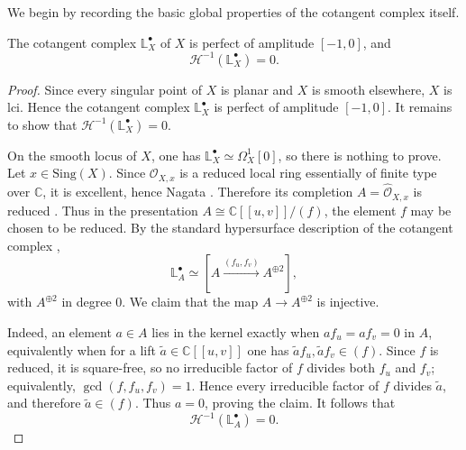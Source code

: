 \documentclass[12pt,reqno]{amsart}
\begin{document}
We begin by recording the basic global properties of the cotangent complex itself.

\begin{lemma}\label{lem:plane-cotangent}
The cotangent complex \(\mathbb{L}^{\bullet}_X\) of \(X\) is perfect of amplitude \([-1,0]\), and
\[
\mathcal H^{-1}(\mathbb{L}^{\bullet}_X)=0.
\]
\end{lemma}

\begin{proof}
Since every singular point of \(X\) is planar and \(X\) is smooth elsewhere, \(X\) is lci. Hence the cotangent complex \(\mathbb{L}^{\bullet}_X\) is perfect of amplitude \([-1,0]\). It remains to show that \(\mathcal H^{-1}(\mathbb{L}^{\bullet}_X)=0\).

On the smooth locus of \(X\), one has \(\mathbb{L}^{\bullet}_X\simeq \Omega_X^1[0]\), so there is nothing to prove. Let \(x\in \mathrm{Sing}(X)\). Since \(\mathcal O_{X,x}\) is a reduced local ring essentially of finite type over \(\mathbb C\), it is excellent, hence Nagata \cite[\href{https://stacks.math.columbia.edu/tag/07QV}{Lemma 07QV}]{stacks-project}. Therefore its completion \(A=\widehat{\mathcal O}_{X,x}\) is reduced \cite[\href{https://stacks.math.columbia.edu/tag/07NZ}{Lemma 07NZ}]{stacks-project}. Thus in the presentation \(A\cong \mathbb{C}[[u,v]]/(f)\), the element \(f\) may be chosen to be reduced.
By the standard hypersurface description of the cotangent complex \cite[\href{https://stacks.math.columbia.edu/tag/08RB}{Lemma 08RB}]{stacks-project},
\begin{equation}\label{eq:plane-hypersurface-model}
\mathbb{L}^{\bullet}_A\simeq \left[A\xrightarrow{(f_u,f_v)}A^{\oplus 2}\right],
\end{equation}
with \(A^{\oplus 2}\) in degree \(0\). We claim that the map \(A\to A^{\oplus 2}\) is injective. 

Indeed, an element \(a\in A\) lies in the kernel exactly when \(af_u=af_v=0\) in \(A\), equivalently when for a lift \(\widetilde a\in \mathbb{C}[[u,v]]\) one has \(\widetilde a f_u,\widetilde a f_v\in (f)\). Since \(f\) is reduced, it is square-free, so no irreducible factor of \(f\) divides both \(f_u\) and \(f_v\); equivalently, \(\gcd(f,f_u,f_v)=1\). Hence every irreducible factor of \(f\) divides \(\widetilde a\), and therefore \(\widetilde a\in (f)\). Thus \(a=0\), proving the claim. It follows that
\[
\mathcal H^{-1}(\mathbb{L}^{\bullet}_A)=0.
\]


\end{proof}
\end{document}

